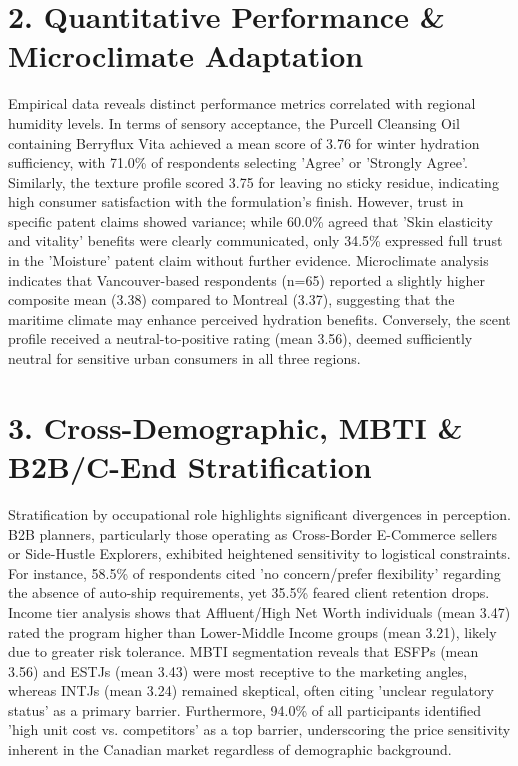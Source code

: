 \documentclass[10pt,twocolumn,a4paper]{article}
\begin{document}
\section{2. Quantitative Performance \& Microclimate Adaptation}
Empirical data reveals distinct performance metrics correlated with regional humidity levels. In terms of sensory acceptance, the Purcell Cleansing Oil containing Berryflux Vita achieved a mean score of 3.76 for winter hydration sufficiency, with 71.0\% of respondents selecting 'Agree' or 'Strongly Agree'. Similarly, the texture profile scored 3.75 for leaving no sticky residue, indicating high consumer satisfaction with the formulation's finish. However, trust in specific patent claims showed variance; while 60.0\% agreed that 'Skin elasticity and vitality' benefits were clearly communicated, only 34.5\% expressed full trust in the 'Moisture' patent claim without further evidence. Microclimate analysis indicates that Vancouver-based respondents (n=65) reported a slightly higher composite mean (3.38) compared to Montreal (3.37), suggesting that the maritime climate may enhance perceived hydration benefits. Conversely, the scent profile received a neutral-to-positive rating (mean 3.56), deemed sufficiently neutral for sensitive urban consumers in all three regions.
\section{3. Cross-Demographic, MBTI \& B2B/C-End Stratification}
Stratification by occupational role highlights significant divergences in perception. B2B planners, particularly those operating as Cross-Border E-Commerce sellers or Side-Hustle Explorers, exhibited heightened sensitivity to logistical constraints. For instance, 58.5\% of respondents cited 'no concern/prefer flexibility' regarding the absence of auto-ship requirements, yet 35.5\% feared client retention drops. Income tier analysis shows that Affluent/High Net Worth individuals (mean 3.47) rated the program higher than Lower-Middle Income groups (mean 3.21), likely due to greater risk tolerance. MBTI segmentation reveals that ESFPs (mean 3.56) and ESTJs (mean 3.43) were most receptive to the marketing angles, whereas INTJs (mean 3.24) remained skeptical, often citing 'unclear regulatory status' as a primary barrier. Furthermore, 94.0\% of all participants identified 'high unit cost vs. competitors' as a top barrier, underscoring the price sensitivity inherent in the Canadian market regardless of demographic background.
\end{document}
